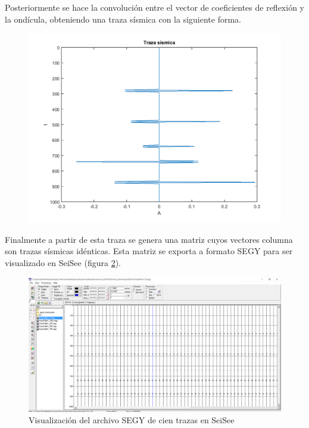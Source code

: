\documentclass[%
 aip,
 jmp,%
 amsmath,amssymb,
 reprint,%
]{revtex4-1}
\begin{document}
Posteriormente se hace la convolución entre el vector de coeficientes de reflexión y la ondícula, obteniendo una traza sísmica con la siguiente forma.

\begin{figure}[h]
\centering
\includegraphics[width=1\linewidth]{TR1}
\caption{}
\label{fig:TR1}
\end{figure}

Finalmente a partir de esta traza se genera una matriz cuyos vectores columna son trazas sísmicas idénticas. Esta matriz se exporta a formato SEGY para ser visualizado en SeiSee (figura \ref{fig:seisee1}).

\begin{figure}[!h]
\centering
\includegraphics[width=1.\linewidth]{seisee1.png}
\caption{Visualización del archivo SEGY de cien trazas en SeiSee}
\label{fig:seisee1}
\end{figure}
\end{document}
